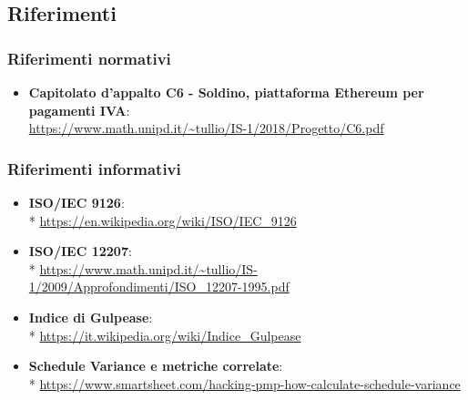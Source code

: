 \subsection{Riferimenti}
\subsubsection{Riferimenti normativi}
\begin{itemize}

\item \textbf{Capitolato d'appalto C6 - Soldino, piattaforma Ethereum per pagamenti IVA}: \\ \url{https://www.math.unipd.it/~tullio/IS-1/2018/Progetto/C6.pdf}
\end{itemize}
\subsubsection{Riferimenti informativi}
\begin{itemize}
\item \textbf{ISO/IEC 9126}: \\* \url{https://en.wikipedia.org/wiki/ISO/IEC_9126}
\item \textbf{ISO/IEC 12207}: \\* 
\url{https://www.math.unipd.it/~tullio/IS-1/2009/Approfondimenti/ISO\_12207-1995.pdf}
\item \textbf{Indice di Gulpease}: \\* \url{https://it.wikipedia.org/wiki/Indice_Gulpease}
\item \textbf{Schedule Variance e metriche correlate}:\\* \url{https://www.smartsheet.com/hacking-pmp-how-calculate-schedule-variance}
\end{itemize}